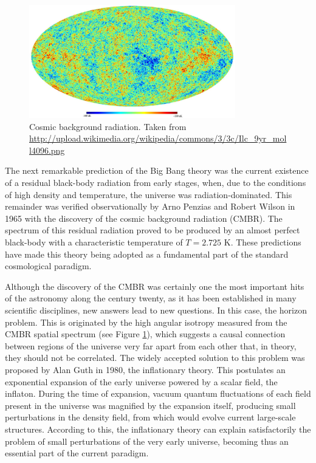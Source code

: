 \
\begin{figure}[htbp]
	\centering
	\includegraphics[width=0.8\textwidth]
	{./figures/1_introduction/CMB.png}
	
	\caption{\small{Cosmic background radiation. Taken from 
	\url{http://upload.wikimedia.org/wikipedia/commons/3/3c/Ilc_9yr_moll4096.png}}}
	
	\label{fig:CMB}
\end{figure}


The next remarkable prediction of the Big Bang theory was the current 
existence of a residual black-body radiation from early stages, when,
due to the conditions of high density and temperature, the universe was 
radiation-dominated. This remainder was verified observationally by Arno 
Penzias and Robert Wilson in 1965 with the discovery of the cosmic 
background radiation (CMBR). The spectrum of this residual radiation proved 
to be produced by an almost perfect black-body with a characteristic 
temperature of  $T = 2.725$ K. These predictions have made this theory 
being adopted as a fundamental part of the standard cosmological paradigm.


Although the discovery of the CMBR was certainly one the most important 
hits of the astronomy along the century twenty, as it has been established 
in many scientific disciplines, new answers lead to new questions. In this 
case, the horizon problem. This is originated by the high angular isotropy 
measured from the CMBR spatial spectrum (see Figure \ref{fig:CMB}), which 
suggests a causal connection between regions of the universe very far apart 
from each other that, in theory, they should not be correlated. The widely 
accepted solution to this problem was proposed by Alan Guth in 1980, the 
inflationary theory. This postulates an exponential expansion of the early 
universe powered by a scalar field, the inflaton. During the time of 
expansion, vacuum quantum fluctuations of each field present in the 
universe was magnified by the expansion itself, producing small 
perturbations in the density field, from which would evolve current 
large-scale structures. According to this, the inflationary theory can 
explain satisfactorily the problem of small perturbations of the very 
early universe, becoming thus an essential part of the current paradigm. 


